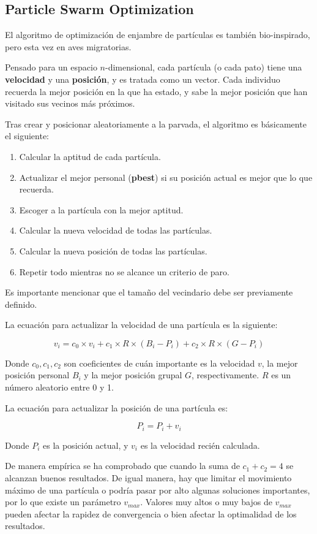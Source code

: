 \documentclass[titlepage, letterpaper]{article}
\begin{document}
\subsection{Particle Swarm Optimization} %
\label{sub:pso}

El algoritmo de optimización de enjambre de partículas es también bio-inspirado, pero esta vez en aves migratorias.

Pensado para un espacio $n$-dimensional, cada partícula (o cada pato) tiene una \textbf{velocidad} y una \textbf{posición}, y es tratada como un vector.
Cada individuo recuerda la mejor posición en la que ha estado, y sabe la mejor posición que han visitado sus vecinos más próximos.

Tras crear y posicionar aleatoriamente a la parvada, el algoritmo es básicamente el siguiente:

\begin{tcolorbox}
\begin{enumerate}
    \item Calcular la aptitud de cada partícula.
    \item Actualizar el mejor personal (\textbf{pbest}) si su posición actual es mejor que lo que recuerda.
    \item Escoger a la partícula con la mejor aptitud.
    \item Calcular la nueva velocidad de todas las partículas.
    \item Calcular la nueva posición de todas las partículas.
    \item Repetir todo mientras no se alcance un criterio de paro.
\end{enumerate}
\end{tcolorbox}

Es importante mencionar que el tamaño del vecindario debe ser previamente definido.

La ecuación para actualizar la velocidad de una partícula es la siguiente:

\begin{equation}
\label{eq:pso_velocity}
v_i = c_0 \times v_i + c_1 \times R \times (B_i - P_i) + c_2 \times R \times (G - P_i)
\end{equation}

Donde $c_0, c_1, c_2$ son coeficientes de cuán importante es la velocidad $v$, la mejor posición personal $B_i$ y la mejor posición grupal $G$, respectivamente.
$R$ es un número aleatorio entre 0 y 1.

La ecuación para actualizar la posición de una partícula es:

\begin{equation}
\label{eq:pso_position}
P_i = P_i + v_i
\end{equation}

Donde $P_i$ es la posición actual, y $v_i$ es la velocidad recién calculada.

De manera empírica se ha comprobado que cuando la suma de $c_1 + c_2 = 4$ se alcanzan buenos resultados.
De igual manera, hay que limitar el movimiento máximo de una partícula o podría pasar por alto algunas soluciones importantes, por lo que existe un parámetro $v_{max}$.
Valores muy altos o muy bajos de $v_{max}$ pueden afectar la rapidez de convergencia o bien afectar la optimalidad de los resultados.
\end{document}
